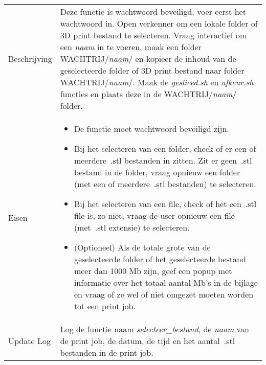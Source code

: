 \documentclass{article}
\begin{document}
\begin{table}[H]
    \centering
    \begin{tabular}%
    {>{\raggedright\arraybackslash}p{}%
    |>{\raggedright\arraybackslash}p{}}
    \rowcolor{myblue}\multicolumn{2}{c}{\rule{0pt}{13pt}Functie: {\Large selecteer\_bestand.sh}} \\\hline
    Beschrijving & Deze functie is wachtwoord beveiligd, voer eerst het wachtwoord in. Open verkenner om een lokale folder of 3D print bestand te selecteren. Vraag interactief om een \textit{naam} in te voeren, maak een folder WACHTRIJ/\textit{naam}/ en kopieer de inhoud van de geselecteerde folder of 3D print bestand naar folder WACHTRIJ/\textit{naam}/. Maak de \textit{gesliced.sh} en \textit{afkeur.sh} functies en plaats deze in de WACHTRIJ/\textit{naam}/ folder.\\
    Eisen & 
    \begin{itemize} 
\item De functie moet wachtwoord beveiligd zijn.
\item Bij het selecteren van een folder, check of er een of meerdere~.stl bestanden in zitten. Zit er geen~.stl bestand in de folder, vraag opnieuw een folder (met een of meerdere~.stl bestanden) te selecteren. 
\item Bij het selecteren van een file, check of het een~.stl file is, zo niet, vraag de user opnieuw een file (met~.stl extensie) te selecteren.
\item (Optioneel) Als de totale grote van de geselecteerde folder of het geselecteerde bestand meer dan 1000 Mb zijn, geef een popup met informatie over het totaal aantal Mb's in de bijlage en vraag of ze wel of niet omgezet moeten worden tot een print job. 
\end{itemize} \\
    Update Log& Log de functie naam \textit{selecteer\_bestand}, de \textit{naam} van de print job, de datum, de tijd en het aantal~.stl bestanden in de print job.\\
    \end{tabular}
\end{table}
\end{document}
